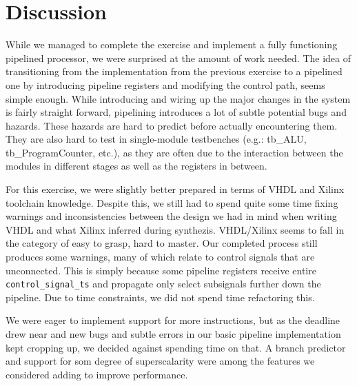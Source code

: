 \chapter{Discussion}

While we managed to complete the exercise and implement a fully functioning pipelined processor, we were surprised at the amount of work needed.
The idea of transitioning from the implementation from the previous exercise to a pipelined one by introducing pipeline registers and modifying the control path, seems simple enough.
While introducing and wiring up the major changes in the system is fairly straight forward, pipelining introduces a lot of subtle potential bugs and hazards.
These hazards are hard to predict before actually encountering them.
They are also hard to test in single-module testbenches (e.g.: tb\_ALU, tb\_ProgramCounter, etc.), as they are often due to the interaction between the modules in different stages as well as the registers in between.

For this exercise, we were slightly better prepared in terms of VHDL and Xilinx toolchain knowledge.
Despite this, we still had to spend quite some time fixing warnings and inconsistencies between the design we had in mind when writing VHDL and what Xilinx inferred during synthezis.
VHDL/Xilinx seems to fall in the category of easy to grasp, hard to master.
Our completed process still produces some warnings, many of which relate to control signals that are unconnected.
This is simply because some pipeline registers receive entire \texttt{control\_signal\_ts} and propagate only select subsignals further down the pipeline.
Due to time constraints, we did not spend time refactoring this.

We were eager to implement support for more instructions, but as the deadline drew near and new bugs and subtle errors in our basic pipeline implementation kept cropping up, we decided against spending time on that.
A branch predictor and support for som degree of superscalarity were among the features we considered adding to improve performance.
